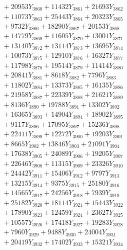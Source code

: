 \documentclass[a4paper,10pt]{article}
\begin{document}
{\begin{align}
&\;  + 20953 Y_{3860} + 11432 Y_{3861} + 21693 Y_{3862} \\[0.3ex]
&\;  + 11073 Y_{3863} + 25443 Y_{3864} + 20323 Y_{3865} \\[0.3ex]
&\;  + 9732 Y_{3866} + 18290 Y_{3867} + 20153 Y_{3868} \\[0.5ex]\allowbreak
&\;  + 14779 Y_{3869} + 11605 Y_{3870} + 13001 Y_{3871} \\[0.3ex]
&\;  + 13140 Y_{3872} + 13114 Y_{3873} + 13695 Y_{3874} \\[0.3ex]
&\;  + 10073 Y_{3875} + 12910 Y_{3876} + 16327 Y_{3877} \\[0.3ex]
&\;  + 11798 Y_{3878} + 19514 Y_{3879} + 11414 Y_{3880} \\[0.3ex]
&\;  + 20841 Y_{3881} + 8618 Y_{3882} + 7796 Y_{3883} \\[0.3ex]
&\;  + 11802 Y_{3884} + 13373 Y_{3885} + 16135 Y_{3886} \\[0.3ex]
&\;  + 21958 Y_{3887} + 22339 Y_{3888} + 21621 Y_{3889} \\[0.3ex]
&\;  + 8136 Y_{3890} + 19788 Y_{3891} + 13302 Y_{3892} \\[0.3ex]
&\;  + 16365 Y_{3893} + 14904 Y_{3894} + 18902 Y_{3895} \\[0.3ex]
&\;  + 9117 Y_{3896} + 17095 Y_{3897} + 15236 Y_{3898} \\[0.5ex]\allowbreak
&\;  + 22411 Y_{3899} + 12272 Y_{3900} + 19203 Y_{3901} \\[0.3ex]
&\;  + 8665 Y_{3902} + 13846 Y_{3903} + 21091 Y_{3904} \\[0.3ex]
&\;  + 17638 Y_{3905} + 24089 Y_{3906} + 19205 Y_{3907} \\[0.3ex]
&\;  + 22646 Y_{3908} + 11315 Y_{3909} + 23326 Y_{3910} \\[0.3ex]
&\;  + 24442 Y_{3911} + 15406 Y_{3912} + 9797 Y_{3913} \\[0.3ex]
&\;  + 13215 Y_{3914} + 9375 Y_{3915} + 25180 Y_{3916} \\[0.3ex]
&\;  + 14565 Y_{3917} + 24256 Y_{3918} + 7939 Y_{3919} \\[0.3ex]
&\;  + 25182 Y_{3920} + 18114 Y_{3921} + 15443 Y_{3922} \\[0.3ex]
&\;  + 17890 Y_{3923} + 12459 Y_{3924} + 23627 Y_{3925} \\[0.3ex]
&\;  + 10557 Y_{3926} + 17418 Y_{3927} + 19283 Y_{3928} \\[0.5ex]\allowbreak
&\;  + 7960 Y_{3929} + 9488 Y_{3930} + 24004 Y_{3931} \\[0.3ex]
&\;  + 20419 Y_{3932} + 17402 Y_{3933} + 15321 Y_{3934} \\[0.3ex]

\end{align}}
\end{document}

